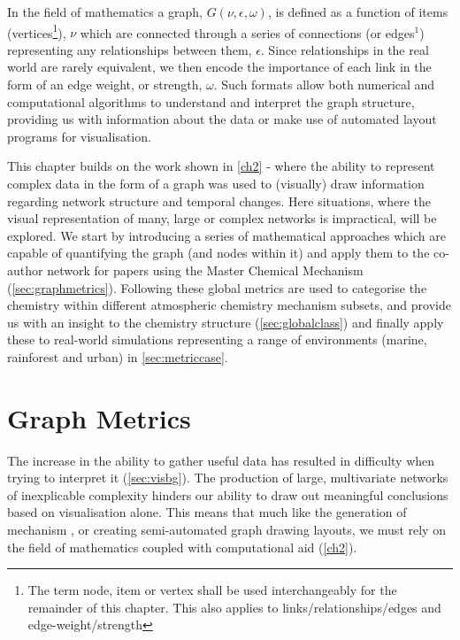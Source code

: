 In the field of mathematics a graph, $G(\nu,\epsilon,\omega)$, is defined as a function of items (vertices\footnote{The term node, item or vertex shall be used interchangeably for the remainder of this chapter. This also applies to links/relationships/edges and edge-weight/strength}), $\nu$ which are connected through a series of connections (or edges$^1$) representing any relationships between them, $\epsilon$. Since relationships in the real world are rarely equivalent, we then encode the importance of each link in the form of an edge weight, or strength, $\omega$. Such formats allow both numerical and computational algorithms to understand and interpret the graph structure, providing us with information about the data or make use of automated layout programs for visualisation.


This chapter builds on the work shown in \autoref{ch2} - where
the ability to represent complex data in the form of a graph was used to (visually) draw information regarding network structure and temporal changes. Here situations, where the visual representation of many, large or complex networks is impractical, will be explored. We start by introducing a series of mathematical approaches which are capable of quantifying the graph (and nodes within it) and apply them to the co-author network for papers using the Master Chemical Mechanism (\autoref{sec:graphmetrics}). Following these global metrics are used to categorise the chemistry within different atmospheric chemistry mechanism subsets, and provide us with an insight to the chemistry structure (\autoref{sec:globalclass}) and finally apply these to real-world simulations representing a range of environments (marine, rainforest and urban) in \autoref{sec:metriccase}.
%
%
%

\section{Graph Metrics}\label{sec:graphmetrics}

The increase in the ability to gather useful data has resulted in difficulty when trying to interpret it (\autoref{sec:visbg}). The production of large, multivariate networks of inexplicable complexity hinders our ability to draw out meaningful conclusions based on visualisation alone. This means that much like the generation of mechanism \citep{protocol}, or creating semi-automated graph drawing layouts, we must rely on the field of mathematics coupled with computational aid (\autoref{ch2}).

